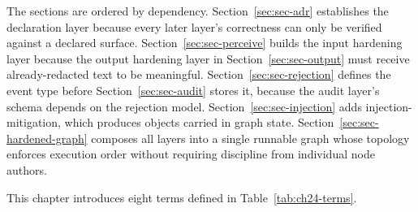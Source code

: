 The sections are ordered by dependency. Section~\ref{sec:sec-adr}
establishes the declaration layer because every later layer's
correctness can only be verified against a declared surface.
Section~\ref{sec:sec-perceive} builds the input hardening layer because
the output hardening layer in Section~\ref{sec:sec-output} must receive
already-redacted text to be meaningful. Section~\ref{sec:sec-rejection}
defines the  event type before
Section~\ref{sec:sec-audit} stores it, because the audit layer's
schema depends on the rejection model. Section~\ref{sec:sec-injection}
adds injection-mitigation, which produces  objects
carried in graph state. Section~\ref{sec:sec-hardened-graph} composes
all layers into a single runnable graph whose topology enforces
execution order without requiring discipline from individual node
authors.

This chapter introduces eight terms defined in
Table~\ref{tab:ch24-terms}.


